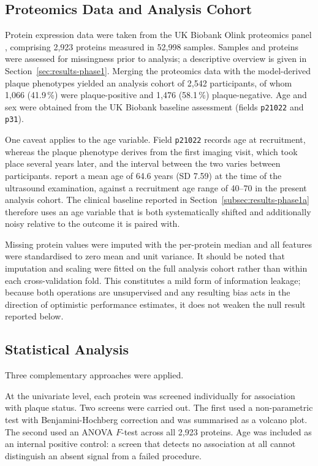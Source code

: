 \subsection{Proteomics Data and Analysis Cohort}
\label{subsec:phase1a-analysis}
Protein expression data were taken from the UK Biobank Olink proteomics panel
\cite{sun2023plasma}, comprising 2{,}923 proteins measured in 52{,}998 samples.
Samples and proteins were assessed for missingness prior to analysis; a descriptive overview is
given in Section~\ref{sec:results-phase1}. Merging the proteomics data with the model-derived
plaque phenotypes yielded an analysis cohort of 2{,}542 participants, of whom 1{,}066 (41.9\,\%)
were plaque-positive and 1{,}476 (58.1\,\%) plaque-negative. Age and sex were obtained from the
UK Biobank baseline assessment (fields \texttt{p21022} and \texttt{p31}).

One caveat applies to the age variable. Field \texttt{p21022} records age at recruitment, whereas
the plaque phenotype derives from the first imaging visit, which took place several years later,
and the interval between the two varies between participants. \textcite{omarov2024deep} report a
mean age of 64.6 years (SD 7.59) at the time of the ultrasound examination, against a recruitment
age range of 40--70 in the present analysis cohort. The clinical baseline reported in
Section~\ref{subsec:results-phase1a} therefore uses an age variable that is both systematically
shifted and additionally noisy relative to the outcome it is paired with.

Missing protein values were imputed with the per-protein median and all features were standardised
to zero mean and unit variance. It should be noted that imputation and scaling were fitted on the
full analysis cohort rather than within each cross-validation fold. This constitutes a mild form
of information leakage; because both operations are unsupervised and any resulting bias acts in
the direction of optimistic performance estimates, it does not weaken the null result reported
below.

\subsection{Statistical Analysis}
Three complementary approaches were applied.

At the univariate level, each protein was screened individually for association with plaque
status. Two screens were carried out. The first used a non-parametric test with
Benjamini-Hochberg correction and was summarised as a volcano plot. The second used an ANOVA
$F$-test across all 2{,}923 proteins. Age was included as an internal positive control: a screen
that detects no association at all cannot distinguish an absent signal from a failed procedure.

